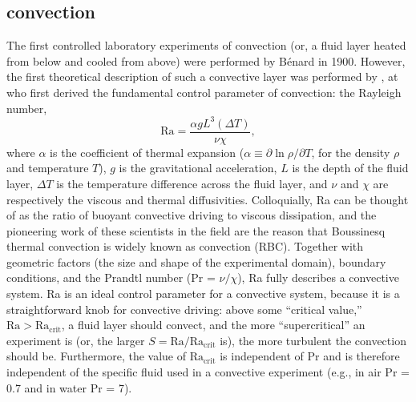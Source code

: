 \subsection{\RB convection}
The first controlled laboratory experiments of convection (or, a fluid layer heated from below and cooled from above) were performed by B\'{e}nard in 1900.
However, the first theoretical description of such a convective layer was performed by \citet{rayleigh1916}, at who first derived the fundamental control parameter of convection: the Rayleigh number,
\begin{equation}
\text{Ra} = \frac{\alpha g L^3 (\Delta T)}{\nu \chi},
\label{eqn:rayleigh_number}
\end{equation}
where $\alpha$ is the coefficient of thermal expansion ($\alpha \equiv \partial \ln \rho / \partial T$, for the density $\rho$ and temperature $T$), $g$ is the gravitational acceleration, $L$ is the depth of the fluid layer, $\Delta T$ is the temperature difference across the fluid layer, and $\nu$ and $\chi$ are respectively the viscous and thermal diffusivities.
Colloquially, Ra can be thought of as the ratio of buoyant convective driving to viscous dissipation, and the pioneering work of these scientists in the field are the reason that Boussinesq thermal convection is widely known as \RB convection (RBC).
Together with geometric factors (the size and shape of the experimental domain), boundary conditions, and the Prandtl number (Pr = $\nu/\chi$), Ra fully describes a convective system.
Ra is an ideal control parameter for a convective system, because it is a straightforward knob for convective driving: above some ``critical value,'' $\text{Ra} > \text{Ra}_{\text{crit}}$, a fluid layer should convect, and the more ``supercritical'' an experiment is (or, the larger $S = \text{Ra}/\text{Ra}_{\text{crit}}$ is), the more turbulent the convection should be.
Furthermore, the value of $\text{Ra}_{\text{crit}}$ is independent of $\text{Pr}$ and is therefore independent of the specific fluid used in a convective experiment (e.g., in air Pr = 0.7 and in water Pr = 7).

